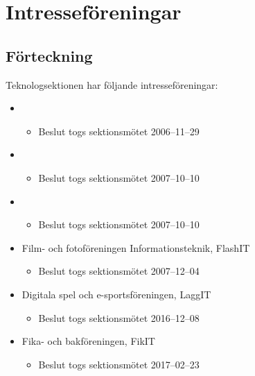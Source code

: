 \section{Intresseföreningar}

\subsection{Förteckning}

Teknologsektionen har följande intresseföreningar:

\begin{itemize}
	\item \EIGHTBITFULL{}
	\begin{itemize}
		\item Beslut togs sektionsmötet 2006--11--29
	\end{itemize}
	\item \DRAWITFULL{}
	\begin{itemize}
		\item Beslut togs sektionsmötet 2007--10--10
	\end{itemize}
	\item \HOOKITFULL{}
	\begin{itemize}
		\item Beslut togs sektionsmötet 2007--10--10
	\end{itemize}
	\item Film- och fotoföreningen Informationsteknik, FlashIT
	\begin{itemize}
		\item Beslut togs sektionsmötet 2007--12--04
	\end{itemize}
	\item Digitala spel och e-sportsföreningen, LaggIT
	\begin{itemize}
		\item Beslut togs sektionsmötet 2016--12--08
	\end{itemize}
        \item Fika- och bakföreningen, FikIT
        \begin{itemize}
                \item Beslut togs sektionsmötet 2017--02--23
        \end{itemize}
\end{itemize}
